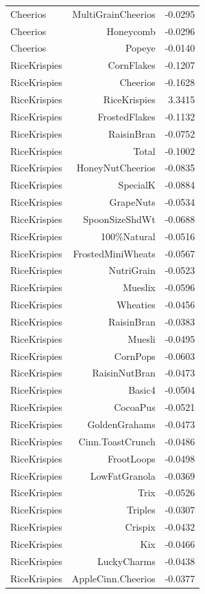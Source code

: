 \begin{longtable}{@{}lrr@{}}
Cheerios & MultiGrainCheerios & -0.0295 \\
Cheerios & Honeycomb & -0.0296 \\
Cheerios & Popeye & -0.0140 \\
RiceKrispies & CornFlakes & -0.1207 \\
RiceKrispies & Cheerios & -0.1628 \\
RiceKrispies & RiceKrispies & 3.3415 \\
RiceKrispies & FrostedFlakes & -0.1132 \\
RiceKrispies & RaisinBran & -0.0752 \\
RiceKrispies & Total & -0.1002 \\
RiceKrispies & HoneyNutCheerios & -0.0835 \\
RiceKrispies & SpecialK & -0.0884 \\
RiceKrispies & GrapeNuts & -0.0534 \\
RiceKrispies & SpoonSizeShdWt & -0.0688 \\
RiceKrispies & 100\%Natural & -0.0516 \\
RiceKrispies & FrostedMiniWheats & -0.0567 \\
RiceKrispies & NutriGrain & -0.0523 \\
RiceKrispies & Mueslix & -0.0596 \\
RiceKrispies & Wheaties & -0.0456 \\
RiceKrispies & RaisinBran & -0.0383 \\
RiceKrispies & Muesli & -0.0495 \\
RiceKrispies & CornPops & -0.0603 \\
RiceKrispies & RaisinNutBran & -0.0473 \\
RiceKrispies & Basic4 & -0.0504 \\
RiceKrispies & CocoaPus & -0.0521 \\
RiceKrispies & GoldenGrahams & -0.0473 \\
RiceKrispies & Cinn.ToastCrunch & -0.0486 \\
RiceKrispies & FrootLoops & -0.0498 \\
RiceKrispies & LowFatGranola & -0.0369 \\
RiceKrispies & Trix & -0.0526 \\
RiceKrispies & Triples & -0.0307 \\
RiceKrispies & Crispix & -0.0432 \\
RiceKrispies & Kix & -0.0466 \\
RiceKrispies & LuckyCharms & -0.0438 \\
RiceKrispies & AppleCinn.Cheerios & -0.0377 \\

\end{longtable}
